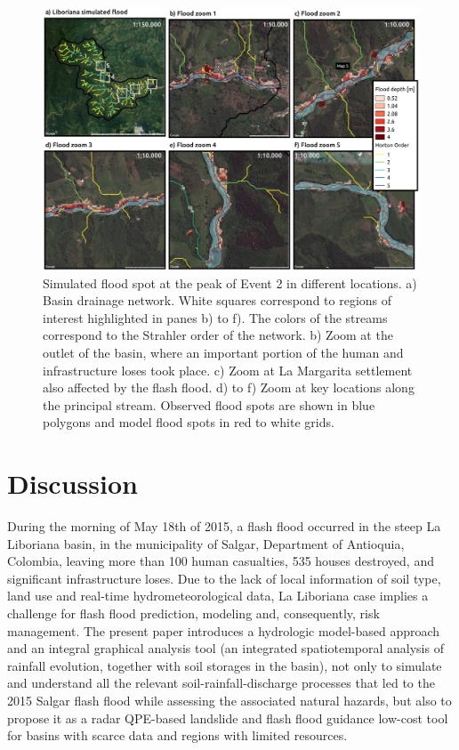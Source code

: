 \documentclass[hess, manuscript]{copernicus}
\begin{document}
\begin{figure}[t!]
\centering
 \includegraphics[width=12cm]{Figures/Manchas2.png}
 \caption{Simulated flood spot at the peak of Event 2 in different locations. a) Basin drainage network. White squares correspond to regions of interest highlighted in panes b) to f). The colors of the streams correspond to the Strahler order of the network. b) Zoom at the outlet of the basin, where an important portion of the human and infrastructure loses took place. c) Zoom at La Margarita settlement also affected by the flash flood. d) to f) Zoom at key locations along the principal stream.  Observed flood spots are shown in blue polygons and model flood spots in red to white grids.}
    \label{fig:SimFloodSpots}
\end{figure}


\section{Discussion}
\label{sec:discussion}

During the morning of May 18th of 2015,  a flash flood occurred in the steep La Liboriana basin, in the municipality of Salgar,  Department of Antioquia, Colombia, leaving more than 100 human casualties, 535 houses destroyed, and significant infrastructure loses.  Due to the lack of local information of soil type, land use and real-time hydrometeorological data, La Liboriana case implies a challenge for flash flood prediction, modeling and, consequently, risk management.  The present paper introduces a hydrologic model-based approach and an integral graphical analysis tool (an integrated spatiotemporal analysis of rainfall evolution, together with soil storages in the basin),  not only to simulate and understand all the relevant soil-rainfall-discharge processes that  led to the 2015 Salgar flash flood while assessing the associated natural hazards, but also to propose it as a radar QPE-based landslide and flash flood guidance low-cost tool for basins with scarce data and regions with limited resources. \\
\end{document}
